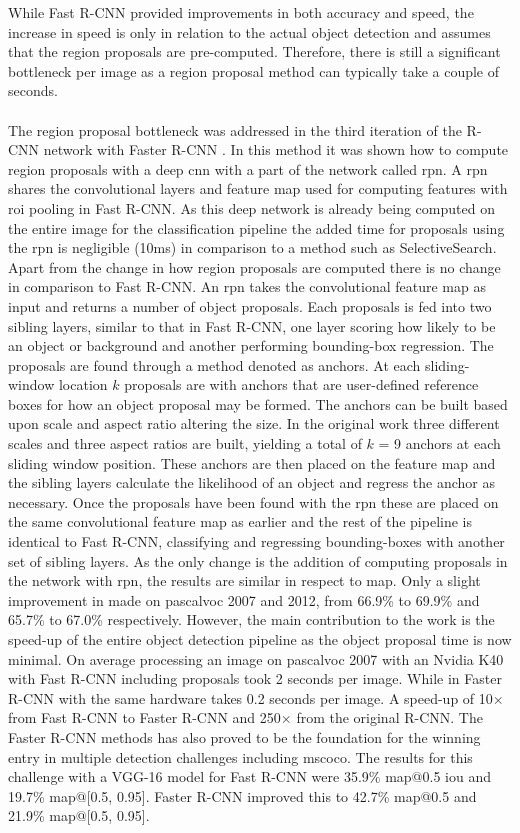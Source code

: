 While Fast R-CNN provided improvements in both accuracy and speed, the increase in speed is only in relation to the actual object detection and assumes that the region proposals are pre-computed. Therefore, there is still a significant bottleneck per image as a region proposal method can typically take a couple of seconds. 
\\\\
The region proposal bottleneck was addressed in the third iteration of the R-CNN network with Faster R-CNN \cite{fasterrcnn}. In this method it was shown how to compute region proposals with a deep \gls{cnn} with a part of the network called \gls{rpn}. A \gls{rpn} shares the convolutional layers and feature map used for computing features with \gls{roi} pooling in Fast R-CNN. As this deep network is already being computed on the entire image for the classification pipeline the added time for proposals using the \gls{rpn} is negligible (10ms) in comparison to a method such as SelectiveSearch. Apart from the change in how region proposals are computed there is no change in comparison to Fast R-CNN. 
An \gls{rpn} takes the convolutional feature map as input and returns a number of object proposals. Each proposals is fed into two sibling layers, similar to that in Fast R-CNN, one layer scoring how likely to be an object or background and another performing bounding-box regression. The proposals are found through a method denoted as anchors. At each sliding-window location $k$ proposals are with anchors that are user-defined reference boxes for how an object proposal may be formed. The anchors can be built based upon scale and aspect ratio altering the size. In the original work three different scales and three aspect ratios are built, yielding a total of $k$ = 9 anchors at each sliding window position. These anchors are then placed on the feature map and the sibling layers calculate the likelihood of an object and regress the anchor as necessary.  
Once the proposals have been found with the \gls{rpn} these are placed on the same convolutional feature map as earlier and the rest of the pipeline is identical to Fast R-CNN, classifying and regressing bounding-boxes with another set of sibling layers. As the only change is the addition of computing proposals in the network with \gls{rpn}, the results are similar in respect to \gls{map}. Only a slight improvement in made on \gls{pascalvoc} 2007 and 2012, from 66.9\% to 69.9\% and 65.7\% to 67.0\% respectively. However, the main contribution to the work is the speed-up of the entire object detection pipeline as the object proposal time is now minimal. On average processing an image on \gls{pascalvoc} 2007 with an Nvidia K40 with Fast R-CNN including proposals took 2 seconds per image. While in Faster R-CNN with the same hardware takes 0.2 seconds per image. A speed-up of 10$\times$ from Fast R-CNN to Faster R-CNN and 250$\times$ from the original R-CNN. The Faster R-CNN methods has also proved to be the foundation for the winning entry in multiple detection challenges including \gls{mscoco}. The results for this challenge with a VGG-16 model for Fast R-CNN were 35.9\% \gls{map}@0.5 \gls{iou} and 19.7\% \gls{map}@[0.5, 0.95]. Faster R-CNN improved this to 42.7\% \gls{map}@0.5 and 21.9\% \gls{map}@[0.5, 0.95].